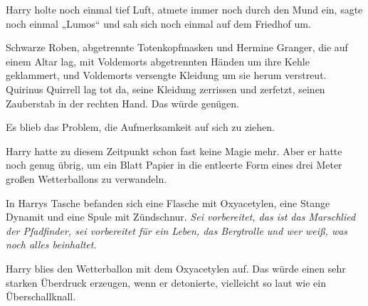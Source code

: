 Harry holte noch einmal tief Luft, atmete immer noch durch den Mund ein, sagte noch einmal „Lumos“ und sah sich noch einmal auf dem Friedhof um.

Schwarze Roben, abgetrennte Totenkopfmasken und Hermine Granger, die auf einem Altar lag, mit Voldemorts abgetrennten Händen um ihre Kehle geklammert, und Voldemorts versengte Kleidung um sie herum verstreut. Quirinus Quirrell lag tot da, seine Kleidung zerrissen und zerfetzt, seinen Zauberstab in der rechten Hand. Das würde genügen.

Es blieb das Problem, die Aufmerksamkeit auf sich zu ziehen.

Harry hatte zu diesem Zeitpunkt schon fast keine Magie mehr. Aber er hatte noch genug übrig, um ein Blatt Papier in die entleerte Form eines drei Meter großen Wetterballons zu verwandeln.

In Harrys Tasche befanden sich eine Flasche mit Oxyacetylen, eine Stange Dynamit und eine Spule mit Zündschnur.
\emph{Sei vorbereitet, das ist das Marschlied der Pfadfinder, sei vorbereitet für ein Leben, das Bergtrolle und wer weiß, was noch alles beinhaltet.}

Harry blies den Wetterballon mit dem Oxyacetylen auf. Das würde einen sehr starken Überdruck erzeugen, wenn er detonierte, vielleicht so laut wie ein Überschallknall.



